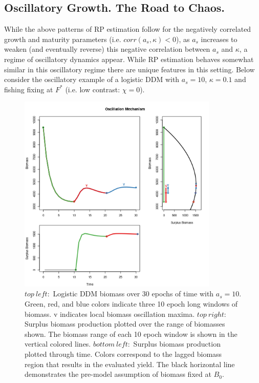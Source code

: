 \subsection{Oscillatory Growth. The Road to Chaos.\label{oscillation}}

While the above patterns of RP estimation follow for the negatively correlated 
growth and maturity parameters (i.e. $corr(a_s, \kappa)<0$),
as $a_s$ increases to weaken (and eventually reverse) this negative 
correlation between $a_s$ and $\kappa$, a regime of oscillatory dynamics appear. %
While RP estimation behaves somewhat similar in this oscillatory regime there 
are unique features in this setting. 
Below consider the oscillatory example of a logistic DDM with 
$a_s=10$, $\kappa=0.1$ and fishing fixing at $F^*$ (i.e. low contrast: $\chi=0$).

\begin{figure}[h!]
\centering
\includegraphics[width=0.85\textwidth]{../ddBias/shockBiomassSurplus.png}%
\vspace{-0.5cm}
\caption{$top~left:$ Logistic DDM biomass over 30 epochs of time with $a_s=10$.
Green, red, and blue colors indicate three 10 epoch long windows of biomass.
v indicates local biomass oscillation maxima.
$top~right:$ %
Surplus biomass production plotted over the range of biomasses shown.
The biomass range of each 10 epoch window is shown in the vertical colored lines.
$bottom~left:$ %
Surplus biomass production plotted through time. Colors correspond to the
lagged biomass region that results in the evaluated yield. The black horizontal
line demonstrates the pre-model assumption of biomass fixed at $B_0$.
}
\label{shock}
\end{figure}

